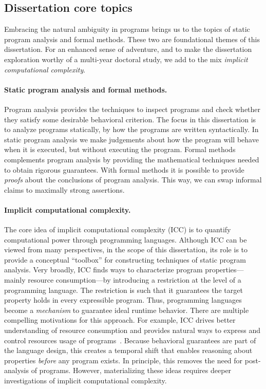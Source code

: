 \subsection{Dissertation core topics}
\label{subsec:dissertation-themes}

Embracing the natural ambiguity in programs brings us to the topics of static program analysis and formal methods.
These two are foundational themes of this dissertation.
For an enhanced sense of adventure, and to make the dissertation exploration worthy of a multi-year doctoral study, we add to the mix \emph{implicit computational complexity}.

\paragraph{Static program analysis and formal methods.}
Program analysis provides the techniques to inspect programs and check whether they satisfy some desirable behavioral criterion.
The focus in this dissertation is to analyze programs statically, \ie by how the programs are written syntactically.
In static program analysis we make judgements about how the program will behave when it is executed, but without executing the program.
Formal methods complements program analysis by providing the mathematical techniques needed to obtain rigorous guarantees.
With formal methods it is possible to provide \emph{proofs} about the conclusions of program analysis.
This way, we can swap informal claims to maximally strong assertions.

\paragraph*{Implicit computational complexity.}
The core idea of implicit computational complexity (ICC) is to quantify computational power through programming languages.
Although ICC can be viewed from many perspectives, in the scope of this dissertation, its role is to provide a conceptual \enquote{toolbox} for constructing techniques of static program analysis.
Very broadly, ICC finds ways to characterize program properties---mainly resource consumption---by introducing a restriction at the level of a programming language.
The restriction is such that it guarantees the target property holds in every expressible program.
Thus, programming languages become a \emph{mechanism} to guarantee ideal runtime behavior.
There are multiple compelling motivations for this approach.
For example, ICC drives better understanding of resource consumption and provides natural ways to express and control resources usage of programs~\cite{kristiansen2017}.
Because behavioral guarantees are part of the language design, this creates a temporal shift that enables reasoning about properties \emph{before} any program exists.
In principle, this removes the need for post-analysis of programs.
However, materializing these ideas requires deeper investigations of implicit computational complexity.

